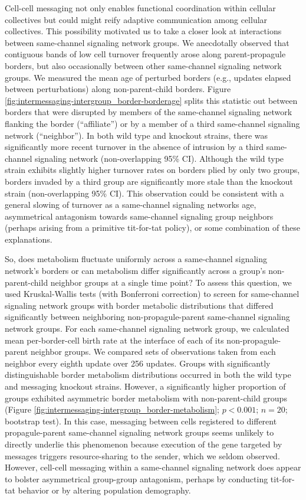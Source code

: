Cell-cell messaging not only enables functional coordination within cellular collectives but could might reify adaptive communication among cellular collectives.
This possibility motivated us to take a closer look at interactions between same-channel signaling network groups.
We anecdotally observed that contiguous bands of low cell turnover frequently arose along parent-propagule borders, but also occasionally between other same-channel signaling network groups.
We measured the mean age of perturbed borders (e.g., updates elapsed between perturbations) along non-parent-child borders.
Figure \ref{fig:intermessaging-intergroup_border-borderage} splits this statistic out between borders that were disrupted by members of the same-channel signaling network flanking the border (``affiliate'') or by a member of a third same-channel signaling network (``neighbor'').
In both wild type and knockout strains, there was significantly more recent turnover in the absence of intrusion by a third same-channel signaling network (non-overlapping 95\% CI).
Although the wild type strain exhibits slightly higher turnover rates on borders plied by only two groups, borders invaded by a third group are significantly more stale than the knockout strain (non-overlapping 95\% CI).
This observation could be consistent with a general slowing of turnover as a same-channel signaling networks age, asymmetrical antagonism towards same-channel signaling group neighbors (perhaps arising from a primitive tit-for-tat policy), or some combination of these explanations.

So, does metabolism fluctuate uniformly across a same-channel signaling network's borders or can metabolism differ significantly across a group's non-parent-child neighbor groups at a single time point?
To assess this question, we used Kruskal-Wallis tests (with Bonferroni correction) to screen for same-channel signaling network groups with border metabolic distributions that differed significantly between neighboring non-propagule-parent same-channel signaling network groups.
For each same-channel signaling network group, we calculated mean per-border-cell birth rate at the interface of each of its non-propagule-parent neighbor groups.
We compared sets of observations taken from each neighbor every eighth update over 256 updates.
Groups with significantly distinguishable border metabolism distributions occurred in both the wild type and messaging knockout strains.
However, a significantly higher proportion of groups exhibited asymmetric border metabolism with non-parent-child groups (Figure \ref{fig:intermessaging-intergroup_border-metabolism}; $p < 0.001$; $n=20$; bootstrap test).
In this case, messaging between cells registered to different propagule-parent same-channel signaling network groups seems unlikely to directly underlie this phenomenon because execution of the gene targeted by messages triggers resource-sharing to the sender, which we seldom observed.
However, cell-cell messaging within a same-channel signaling network does appear to bolster asymmetrical group-group antagonism, perhaps by conducting tit-for-tat behavior or by altering population demography.

